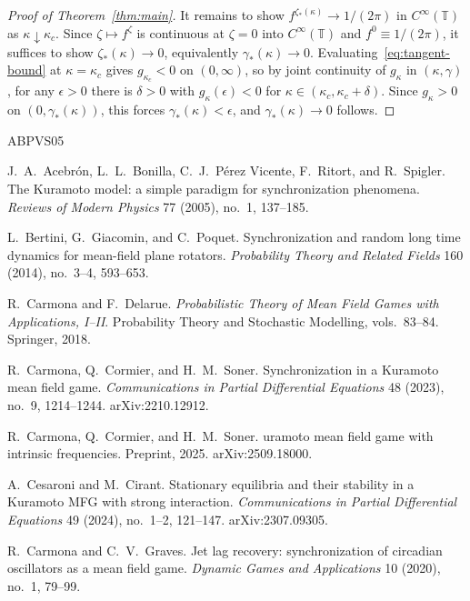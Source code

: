 \documentclass{amsart}
\newcommand{\T}{\mathbb T}
\begin{document}
\begin{proof}[Proof of Theorem~\ref{thm:main}]
It remains to show $f^{\zeta_*(\kappa)}\to 1/(2\pi)$ in $C^\infty(\T)$
as $\kappa\downarrow\kappa_c$. Since $\zeta\mapsto f^\zeta$ is
continuous at $\zeta=0$ into $C^\infty(\T)$ and $f^0\equiv 1/(2\pi)$,
it suffices to show $\zeta_*(\kappa)\to 0$, equivalently
$\gamma_*(\kappa)\to 0$. Evaluating~\eqref{eq:tangent-bound} at
$\kappa=\kappa_c$ gives
$g_{\kappa_c}<0$ on $(0,\infty)$, so by joint continuity of $g_\kappa$
in $(\kappa,\gamma)$, for any $\epsilon>0$ there is $\delta>0$ with
$g_\kappa(\epsilon)<0$ for $\kappa\in(\kappa_c,\kappa_c+\delta)$. Since
$g_\kappa>0$ on $(0,\gamma_*(\kappa))$, this forces
$\gamma_*(\kappa)<\epsilon$, and $\gamma_*(\kappa)\to 0$ follows.
\end{proof}

\begin{thebibliography}{ABPVS05}

J.~A.~Acebr\'on, L.~L.~Bonilla, C.~J.~P\'erez Vicente, F.~Ritort, and
  R.~Spigler.
\newblock The {K}uramoto model: a simple paradigm for synchronization
  phenomena.
\newblock \emph{Reviews of Modern Physics} 77 (2005), no.\ 1, 137--185.

L.~Bertini, G.~Giacomin, and C.~Poquet.
\newblock Synchronization and random long time dynamics for mean-field
  plane rotators.
\newblock \emph{Probability Theory and Related Fields} 160 (2014),
  no.\ 3--4, 593--653.

R.~Carmona and F.~Delarue.
\newblock \emph{Probabilistic Theory of Mean Field Games with
  Applications, I--II}.
\newblock Probability Theory and Stochastic Modelling, vols.\ 83--84.
  Springer, 2018.

R.~Carmona, Q.~Cormier, and H.~M.~Soner.
\newblock Synchronization in a {K}uramoto mean field game.
\newblock \emph{Communications in Partial Differential Equations}
  48 (2023), no.\ 9, 1214--1244. arXiv:2210.12912.

R.~Carmona, Q.~Cormier, and H.~M.~Soner.
uramoto mean field game with intrinsic frequencies.
\newblock Preprint, 2025. arXiv:2509.18000.

A.~Cesaroni and M.~Cirant.
\newblock Stationary equilibria and their stability in a {K}uramoto {MFG}
  with strong interaction.
\newblock \emph{Communications in Partial Differential Equations}
  49 (2024), no.\ 1--2, 121--147. arXiv:2307.09305.

R.~Carmona and C.~V.~Graves.
\newblock Jet lag recovery: synchronization of circadian oscillators
  as a mean field game.
\newblock \emph{Dynamic Games and Applications} 10 (2020), no.\ 1,
  79--99.


\end{thebibliography}
\end{document}
